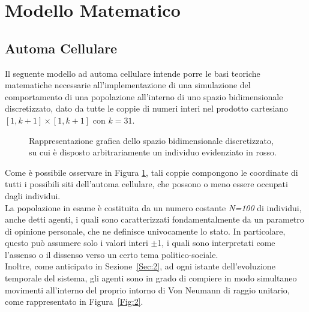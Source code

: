 \documentclass[letterpaper,10pt]{article}
\begin{document}
\section{Modello Matematico}
\label{Sec:3}

\subsection{Automa Cellulare}
\label{Sec:3.1}
Il seguente modello ad automa cellulare \cite{modeling} intende porre le basi teoriche matematiche necessarie all'implementazione di una simulazione del comportamento di una popolazione all’interno di uno spazio bidimensionale discretizzato, dato da tutte le coppie di numeri interi nel prodotto cartesiano $[1,k+1]\times[1,k+1]$ con $k=31$.

\begin{figure}[h]
\centering
{}
\caption{Rappresentazione grafica dello spazio bidimensionale discretizzato, su cui è disposto arbitrariamente un individuo evidenziato in rosso.}
\label{Fig:1}
\end{figure}

Come è possibile osservare in Figura \ref{Fig:1}, tali coppie compongono le coordinate di tutti i possibili siti dell'automa cellulare, che possono o meno essere occupati dagli individui.
\\ La popolazione in esame è costituita da un numero costante \textit{N=100} di individui, anche detti agenti, i quali sono caratterizzati fondamentalmente da un parametro di opinione personale, che ne definisce univocamente lo stato.
In particolare, questo può assumere solo i valori interi $\pm$1, i quali sono interpretati come l'assenso o il dissenso verso un certo tema politico-sociale.
\bigskip \bigskip
\\ Inoltre, come anticipato in Sezione~\ref{Sec:2}, ad ogni istante dell’evoluzione temporale del sistema, gli agenti sono in grado di compiere in modo simultaneo movimenti all'interno del proprio intorno di Von Neumann di raggio unitario, come rappresentato in Figura~\ref{Fig:2}.
\end{document}
